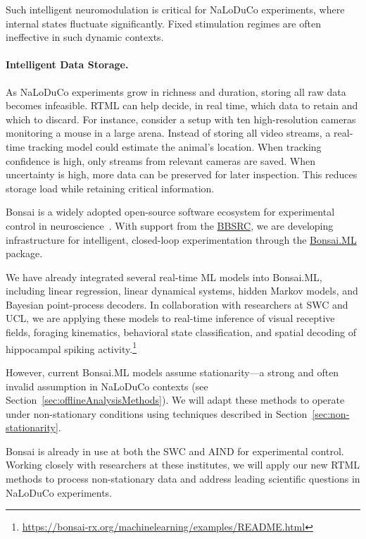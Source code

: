 Such intelligent neuromodulation is critical for NaLoDuCo experiments, where internal states fluctuate significantly. Fixed stimulation regimes are often ineffective in such dynamic contexts.

\paragraph{Intelligent Data Storage.}
As NaLoDuCo experiments grow in richness and duration, storing all raw data becomes infeasible. RTML can help decide, in real time, which data to retain and which to discard. For instance, consider a setup with ten high-resolution cameras monitoring a mouse in a large arena. Instead of storing all video streams, a real-time tracking model could estimate the animal's location. When tracking confidence is high, only streams from relevant cameras are saved. When uncertainty is high, more data can be preserved for later inspection. This reduces storage load while retaining critical information.

\label{sec:bonsai}

Bonsai is a widely adopted open-source software ecosystem for experimental control in neuroscience~\citep{lopesEtAl15}. With support from the \href{https://gow.bbsrc.ukri.org/grants/AwardDetails.aspx?FundingReference=BB\%2FW019132\%2F1}{BBSRC}, we are developing infrastructure for intelligent, closed-loop experimentation through the \href{https://bonsai-rx.org/machinelearning/}{Bonsai.ML} package.

We have already integrated several real-time ML models into Bonsai.ML, including linear regression, linear dynamical systems, hidden Markov models, and Bayesian point-process decoders. In collaboration with researchers at SWC and UCL, we are applying these models to real-time inference of visual receptive fields, foraging kinematics, behavioral state classification, and spatial decoding of hippocampal spiking activity.\footnote{\url{https://bonsai-rx.org/machinelearning/examples/README.html}}

However, current Bonsai.ML models assume stationarity—a strong and often invalid assumption in NaLoDuCo contexts (see Section~\ref{sec:offlineAnalysisMethods}). We will adapt these methods to operate under non-stationary conditions using techniques described in Section~\ref{sec:non-stationarity}.

Bonsai is already in use at both the SWC and AIND for experimental control. Working closely with researchers at these institutes, we will apply our new RTML methods to process non-stationary data and address leading scientific questions in NaLoDuCo experiments.


